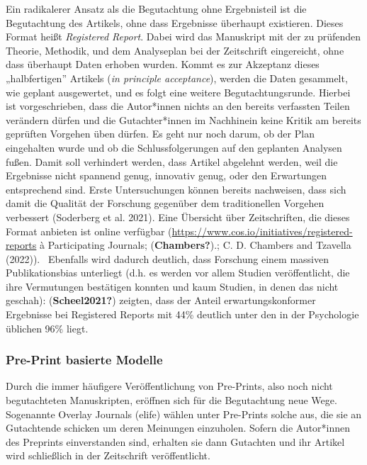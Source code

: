\documentclass[
  letterpaper,
  DIV=11,
  numbers=noendperiod]{scrreprt}
\begin{document}
Ein radikalerer Ansatz als die Begutachtung ohne Ergebnisteil ist die
Begutachtung des Artikels, ohne dass Ergebnisse überhaupt existieren.
Dieses Format heißt \emph{Registered Report}. Dabei wird das Manuskript
mit der zu prüfenden Theorie, Methodik, und dem Analyseplan bei der
Zeitschrift eingereicht, ohne dass überhaupt Daten erhoben wurden. Kommt
es zur Akzeptanz dieses „halbfertigen'' Artikels (\emph{in principle
acceptance}), werden die Daten gesammelt, wie geplant ausgewertet, und
es folgt eine weitere Begutachtungsrunde. Hierbei ist vorgeschrieben,
dass die Autor*innen nichts an den bereits verfassten Teilen verändern
dürfen und die Gutachter*innen im Nachhinein keine Kritik am bereits
geprüften Vorgehen üben dürfen. Es geht nur noch darum, ob der Plan
eingehalten wurde und ob die Schlussfolgerungen auf den geplanten
Analysen fußen. Damit soll verhindert werden, dass Artikel abgelehnt
werden, weil die Ergebnisse nicht spannend genug, innovativ genug, oder
den Erwartungen entsprechend sind. Erste Untersuchungen können bereits
nachweisen, dass sich damit die Qualität der Forschung gegenüber dem
traditionellen Vorgehen verbessert (Soderberg et al. 2021). Eine
Übersicht über Zeitschriften, die dieses Format anbieten ist online
verfügbar (\url{https://www.cos.io/initiatives/registered-reports} à
Participating Journals; (\textbf{Chambers?}).; C. D. Chambers and
Tzavella (2022)).~ Ebenfalls wird dadurch deutlich, dass Forschung einem
massiven Publikationsbias unterliegt (d.h. es werden vor allem Studien
veröffentlicht, die ihre Vermutungen bestätigen konnten und kaum
Studien, in denen das nicht geschah): (\textbf{Scheel2021?}) zeigten,
dass der Anteil erwartungskonformer Ergebnisse bei Registered Reports
mit 44\% deutlich unter den in der Psychologie üblichen 96\% liegt.

\subsubsection{Pre-Print basierte
Modelle}\label{pre-print-basierte-modelle}

Durch die immer häufigere Veröffentlichung von Pre-Prints, also noch
nicht begutachteten Manuskripten, eröffnen sich für die Begutachtung
neue Wege. Sogenannte Overlay Journals (elife) wählen unter Pre-Prints
solche aus, die sie an Gutachtende schicken um deren Meinungen
einzuholen. Sofern die Autor*innen des Preprints einverstanden sind,
erhalten sie dann Gutachten und ihr Artikel wird schließlich in der
Zeitschrift veröffentlicht.
\end{document}
